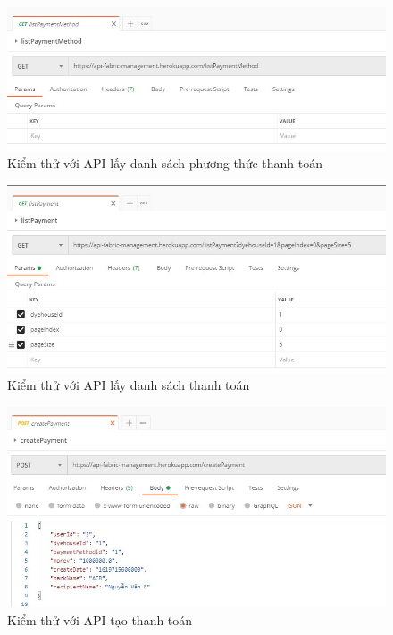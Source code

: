 \begin{figure}[H]
    \begin{center}
        \includegraphics[width=12cm]{Image/API/11_listPaymentMethod.jpg}
        \caption{Kiểm thử với API lấy danh sách phương thức thanh toán}
        \label{listPaymentMethod}
    \end{center}
\end{figure}
\begin{figure}[H]
    \begin{center}
        \includegraphics[width=12cm]{Image/API/12_listPayment.jpg}
        \caption{Kiểm thử với API lấy danh sách thanh toán}
        \label{listPayment}
    \end{center}
\end{figure}
\begin{figure}[H]
    \begin{center}
        \includegraphics[width=12cm]{Image/API/13_createPayment.jpg}
        \caption{Kiểm thử với API tạo thanh toán}
        \label{updateDyehouse}
    \end{center}
\end{figure}


